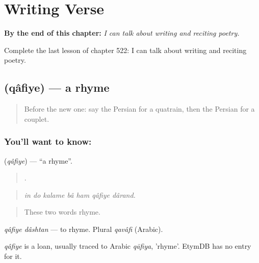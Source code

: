 
\chapter{Writing Verse}
\label{ch:fa-writing-verse}

\begin{chapteropening}
\textbf{By the end of this chapter:} \emph{I can talk about writing and reciting poetry.}

Complete the last lesson of chapter 522: I can talk about writing and reciting poetry.
\end{chapteropening}

\section[\texorpdfstring{\fa{قافیه} (qâfiye)}{قافیه (qâfiye)}]{ (qâfiye) — a rhyme}

\label{lesson:FA-C522-qafiye}



\begin{quote}
Before the new one: say the Persian for a quatrain, then the Persian for a couplet.
\end{quote}

\subsection*{You'll want to know: }
\textbf{} (\emph{qâfiye}) — \textquotedblleft{}a rhyme\textquotedblright{}.

\begin{quote}
      .
\end{quote}

\begin{quote}
\emph{in do kalame bâ ham qâfiye dârand.}
\end{quote}

\begin{quote}
These two words rhyme.
\end{quote}

\emph{qâfiye dâshtan} — to rhyme. Plural \emph{qavâfi} (Arabic).

\begin{cousinweb}
\emph{qâfiye} is a loan, usually traced to Arabic \emph{qāfiya}, 'rhyme'. EtymDB has no entry for it.
\end{cousinweb}

